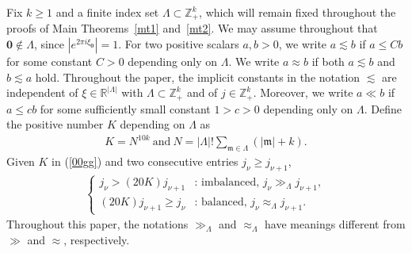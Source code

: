 \documentclass[11 pt,letterpaper]{amsart}
\theoremstyle{plain}
\theoremstyle{definition}
\theoremstyle{remark} \theoremstyle{exam} \theoremstyle{ob}
\numberwithin{equation}{section}
\begin{document}
Fix $k\geq 1$ and a finite index set
$\Lambda\subset\mathbb{Z}_+^k$, which will remain fixed throughout the proofs of
Main Theorems~\ref{mt1} and~\ref{mt2}.
We may assume throughout that $\mathbf{0} \notin \Lambda$,
since $|e^{2\pi i \xi_{\mathbf{0}}}| = 1$. For two positive scalars $a,b>0$, we write $a \lesssim b$ if
$a \le C b$ for some constant $C>0$ depending only on $\Lambda$.
We write $a\approx b$ if both $a\lesssim b$ and $b\lesssim a$ hold.
Throughout the paper, the implicit constants in the notation $\lesssim$
are independent of $\xi \in \mathbb{R}^{|\Lambda|}$ with
$\Lambda \subset \mathbb{Z}_+^{k}$ and of $j \in \mathbb{Z}_+^{k}$.
Moreover, we write $a \ll b$ if 
$a \leq cb$ for some sufficiently small constant $1>c>0$ depending only on $\Lambda$. Define  the positive number $K$ depending on $\Lambda$ as
   \begin{align}\label{00gg}
   	K=N^{10k}\ \text{and}\ N=\lvert\Lambda\rvert!\sum_{\mathfrak{m}\in \Lambda} (|\mathfrak{m}|+k).
   \end{align}
  Given  $K$  in (\ref{00gg}) and two consecutive entries $j_\nu\ge j_{\nu+1}$,
\begin{align}\label{balance}
	\begin{cases}
		j_\nu>(20K)j_{\nu+1} &\text{: imbalanced, } j_\nu\gg_\Lambda j_{\nu+1},\\
		(20K)j_{\nu+1}\ge j_\nu &\text{: balanced, } j_\nu\approx_\Lambda j_{\nu+1}.
	\end{cases}
\end{align}
Throughout this paper, the notations $\gg_{\Lambda}$ and $\approx_{\Lambda}$ have meanings different from $\gg$ and $\approx$, respectively.
   
\end{document}

